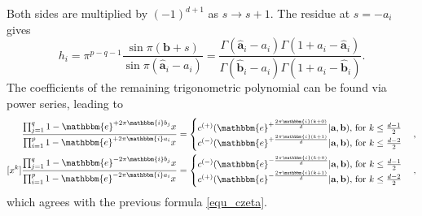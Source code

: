 \documentclass[12pt]{article}
\newcommand{\ee}[0] {\mathbbm{e}}
\newcommand{\ii}[0] {\mathbbm{i}}
\numberwithin{equation}{section}
\newcommand{\bfa}[0] {\mathbf{a}}
\newcommand{\bfb}[0] {\mathbf{b}}
\begin{document}
Both sides are multiplied by $(-1)^{d+1}$ as $s \to s+1$. The residue at $s=-a_i$ gives
\begin{equation*}
h_i = \pi^{p-q-1} \frac{\sin \pi(\bfb + s) }{\sin \pi(\hat{\bfa}_i - a_i) } = \frac{\Gamma(\hat{\bfa}_i- a_i)\Gamma(1+ a_i-\hat{\bfa}_i)}{\Gamma(\hat{\bfb}_i- a_i)\Gamma(1+ a_i-\hat{\bfb}_i)}\text{.}
\end{equation*}
The coefficients of the remaining trigonometric polynomial can be found via power series, leading to
\begin{align*}
[x^k] \frac{\prod_{j=1}^{q} {1- \ee^{+2\pi \ii b_j}x}}{\prod_{i=1}^{p} {1- \ee^{+2\pi \ii a_i} x}} &= \begin{cases} c^{(+)}(\ee^{+\frac{2\pi \ii (k+0)}{d}} | \bfa, \bfb)\text{, for } k \le \frac{d-1}{2} \\
c^{(-)}(\ee^{+\frac{2\pi \ii (k+1)}{d}} | \bfa, \bfb)\text{, for } k \le \frac{d-2}{2}
\end{cases}\text{,}\\
[x^k] \frac{\prod_{j=1}^{q} {1- \ee^{-2\pi \ii b_j}x}}{\prod_{i=1}^{p} {1- \ee^{-2\pi \ii a_i} x}} &= \begin{cases} c^{(-)}(\ee^{-\frac{2\pi \ii (k+0)}{d}} | \bfa, \bfb)\text{, for } k \le \frac{d-1}{2} \\
c^{(+)}(\ee^{-\frac{2\pi \ii (k+1)}{d}} | \bfa, \bfb)\text{, for } k \le \frac{d-2}{2}
\end{cases}\text{,}
\end{align*}
which agrees with the previous formula \eqref{equ_czeta}.
\end{document}
